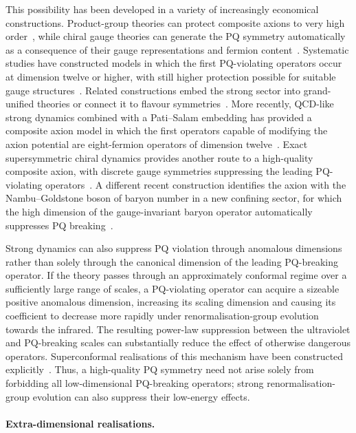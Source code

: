 \documentclass[review]{elsarticle}
\numberwithin{equation}{section}
\numberwithin{table}{section}
\numberwithin{figure}{section}
\begin{document}
This possibility has been developed in a variety of increasingly economical constructions. Product-group theories can protect composite axions to very high order~\cite{Lillard:2018fdt}, while chiral gauge theories can generate the PQ symmetry automatically as a consequence of their gauge representations and fermion content~\cite{Gavela:2018paw,Ardu:2020qmo}. Systematic studies have constructed models in which the first PQ-violating operators occur at dimension twelve or higher, with still higher protection possible for suitable gauge structures~\cite{Contino:2021ayn}. Related constructions embed the strong sector into grand-unified theories or connect it to flavour symmetries~\cite{DiLuzio:2020qio,DiLuzio:2020xgc}. More recently, QCD-like strong dynamics combined with a Pati--Salam embedding has provided a composite axion model in which the first operators capable of modifying the axion potential are eight-fermion operators of dimension twelve~\cite{Gherghetta:2025fip}. Exact supersymmetric chiral dynamics provides another route to a high-quality composite axion, with discrete gauge symmetries suppressing the leading PQ-violating operators~\cite{Gherghetta:2025kff}. A different recent construction identifies the axion with the Nambu--Goldstone boson of baryon number in a new confining sector, for which the high dimension of the gauge-invariant baryon operator automatically suppresses PQ breaking~\cite{Agrawal:2025mke}.

Strong dynamics can also suppress PQ violation through anomalous dimensions rather than solely through the canonical dimension of the leading PQ-breaking operator. If the theory passes through an approximately conformal regime over a sufficiently large range of scales, a PQ-violating operator can acquire a sizeable positive anomalous dimension, increasing its scaling dimension and causing its coefficient to decrease more rapidly under renormalisation-group evolution towards the infrared. The resulting power-law suppression between the ultraviolet and PQ-breaking scales can substantially reduce the effect of otherwise dangerous operators. Superconformal realisations of this mechanism have been constructed explicitly~\cite{Nakai:2021nyf}. Thus, a high-quality PQ symmetry need not arise solely from forbidding all low-dimensional PQ-breaking operators; strong renormalisation-group evolution can also suppress their low-energy effects.

\paragraph{Extra-dimensional realisations.}
\end{document}
